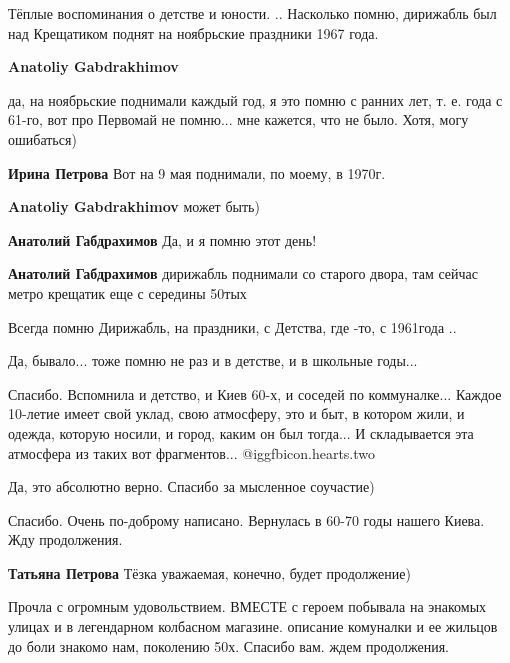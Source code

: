 \begin{itemize}

Тёплые воспоминания о детстве и юности. .. Насколько помню, дирижабль был над
Крещатиком поднят на ноябрьские праздники 1967 года.

\begin{itemize} %
\textbf{Anatoliy Gabdrakhimov} 

да, на ноябрьские поднимали каждый год, я это помню с ранних лет, т. е. года с
61-го, вот про Первомай не помню... мне кажется, что не было. Хотя, могу
ошибаться)

\textbf{Ирина Петрова} Вот на 9 мая поднимали, по моему, в 1970г.

\textbf{Anatoliy Gabdrakhimov} может быть)

\textbf{Анатолий Габдрахимов} Да, и я помню этот день!

\textbf{Анатолий Габдрахимов} дирижабль поднимали со старого двора, там сейчас метро крещатик еще с середины 50тых

Всегда помню Дирижабль, на праздники, с Детства, где -то, с 1961года ..

Да, бывало... тоже помню не раз и в детстве, и в школьные годы...
\end{itemize} %


Спасибо. Вспомнила и детство, и Киев 60-х, и соседей по коммуналке... Каждое
10-летие имеет свой уклад, свою атмосферу, это и быт, в котором жили, и одежда,
которую носили, и город, каким он был тогда... И складывается эта атмосфера из
таких вот фрагментов...  @igg{fbicon.hearts.two} 

Да, это абсолютно верно. Спасибо за мысленное соучастие)

Спасибо. Очень по-доброму написано. Вернулась в 60-70 годы нашего Киева. Жду продолжения.

\begin{itemize} %
\textbf{Татьяна Петрова} Тёзка уважаемая, конечно, будет продолжение)


Прочла с огромным удовольствием. ВМЕСТЕ с героем побывала на энакомых улицах и
в легендарном колбасном магазине. описание комуналки и ее жильцов до боли
знакомо нам, поколению 50х. Спасибо вам. ждем продолжения.


\end{itemize}
\end{itemize}
